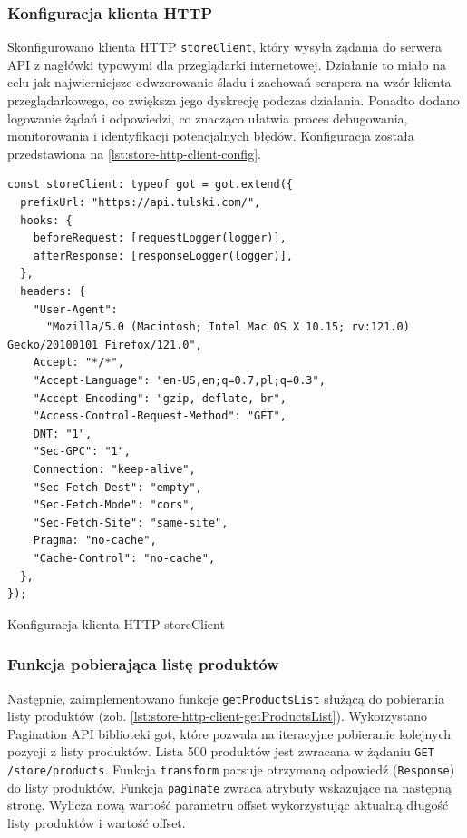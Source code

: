 \subsubsection{Konfiguracja klienta HTTP}\label{subsubsec:storeclient}

Skonfigurowano klienta HTTP \texttt{storeClient}, który wysyła żądania do serwera API z nagłówki typowymi dla przeglądarki internetowej.
Działanie to miało na celu jak najwierniejsze odwzorowanie śladu i zachowań scrapera na wzór klienta przeglądarkowego, co zwiększa jego dyskrecję podczas działania.
Ponadto dodano logowanie żądań i odpowiedzi, co znacząco ułatwia proces debugowania, monitorowania i identyfikacji potencjalnych błędów.
Konfiguracja została przedstawiona na \autoref{lst:store-http-client-config}.

\begin{listing}[H]
    \begin{verbatim}
const storeClient: typeof got = got.extend({
  prefixUrl: "https://api.tulski.com/",
  hooks: {
    beforeRequest: [requestLogger(logger)],
    afterResponse: [responseLogger(logger)],
  },
  headers: {
    "User-Agent":
      "Mozilla/5.0 (Macintosh; Intel Mac OS X 10.15; rv:121.0) Gecko/20100101 Firefox/121.0",
    Accept: "*/*",
    "Accept-Language": "en-US,en;q=0.7,pl;q=0.3",
    "Accept-Encoding": "gzip, deflate, br",
    "Access-Control-Request-Method": "GET",
    DNT: "1",
    "Sec-GPC": "1",
    Connection: "keep-alive",
    "Sec-Fetch-Dest": "empty",
    "Sec-Fetch-Mode": "cors",
    "Sec-Fetch-Site": "same-site",
    Pragma: "no-cache",
    "Cache-Control": "no-cache",
  },
});
    \end{verbatim}
    \caption{Konfiguracja klienta HTTP storeClient}
    \label{lst:store-http-client-config}
\end{listing}

\subsubsection{Funkcja pobierająca listę produktów}

Następnie, zaimplementowano funkcje \texttt{getProductsList} służącą do pobierania listy produktów (zob. \autoref{lst:store-http-client-getProductsList}).
Wykorzystano Pagination API biblioteki got\cite{got-paginate-docs}, które pozwala na iteracyjne pobieranie kolejnych pozycji z listy produktów.
Lista 500 produktów jest zwracana w żądaniu \texttt{GET /store/products}.
Funkcja \texttt{transform} parsuje otrzymaną odpowiedź (\texttt{Response}) do listy produktów.
Funkcja \texttt{paginate} zwraca atrybuty wskazujące na następną stronę. Wylicza nową wartość parametru offset wykorzystując aktualną długość listy produktów i wartość offset.

